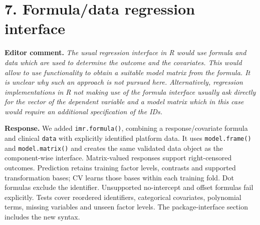 \documentclass[11pt]{article}
\newcommand{\code}[1]{\texttt{#1}}
\newenvironment{editorcomment}
  {\par\smallskip\sloppy\noindent\textbf{Editor comment.}\itshape}
  {\par\smallskip\fussy}
\newenvironment{response}
  {\noindent\textbf{Response.}}
  {\par\smallskip}
\begin{document}
\section*{7. Formula/data regression interface}
\begin{editorcomment}
The usual regression interface in R would use formula and data which are used to
determine the outcome and the covariates. This would allow to use functionality
to obtain a suitable model matrix from the formula. It is unclear why such an
approach is not pursued here. Alternatively, regression implementations in R not
making use of the formula interface usually ask directly for the vector of the
dependent variable and a model matrix which in this case would require an
additional specification of the IDs.
\end{editorcomment}
\begin{response}
We added \code{imr.formula()}, combining a response/covariate formula and
clinical \code{data} with explicitly identified platform data. It uses
\code{model.frame()} and \code{model.matrix()} and creates the same validated
data object as the component-wise interface. Matrix-valued responses support
right-censored outcomes. Prediction retains training factor levels, contrasts
and supported transformation bases; CV learns those bases within each training
fold. Dot formulas exclude the identifier. Unsupported no-intercept and offset
formulas fail explicitly. Tests cover reordered identifiers, categorical
covariates, polynomial terms, missing variables and unseen factor levels.
The package-interface section includes the new syntax.
\end{response}
\end{document}
